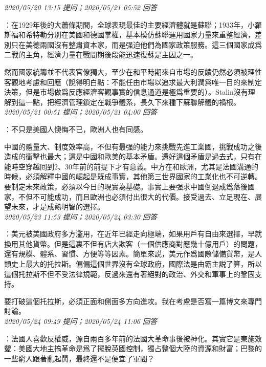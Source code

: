 \documentclass[twocolumn]{ctexart}
\begin{document}
\textit{\hfill\noindent\small 2020/05/20 13:15 提问；2020/05/21 05:52 回答}

：在1929年後的大蕭條期間，全球表現最佳的主要經濟體就是蘇聯；1933年，小羅斯福和希特勒分別在美國和德國掌權，基本模仿蘇聯運用國家力量來重整經濟，差別只在美德兩國沒有整肅資本家，而是强迫他們為國家政策服務。這三個國家成爲二戰的主角，經濟力量在戰間期後段能迅速復蘇是主因之一。

然而國家統籌並不代表官僚獨大，至少在和平時期來自市場的反饋仍然必須被理性客觀地考慮和回應（說得明白點：不能任由市場以追求最大利潤爲唯一目的來制定決策，但是市場做爲反應經濟客觀事實的信息通道是極爲重要的）。Stalin沒有理解到這一點，把經濟管理鎖定在戰爭體系，長久下來種下蘇聯解體的禍根。
\\

\textit{\hfill\noindent\small 2020/05/21 00:51 提问；2020/05/21 04:00 回答}

：不只是美國人懊悔不已，歐洲人也有同感。

中國的體量大、制度效率高，不但有最强的能力來挑戰先進工業國，挑戰成功之後造成的衝擊也最大；這是中國和歐美的基本矛盾。還好這個矛盾是過去式，只有在能時空穿越囘到2、30年前的前提下才有意義。中方在和歐洲，尤其是法國溝通的時候，必須解釋中國的崛起是既成事實，其他第三世界國家的工業化也不可逆轉。要制定未來政策，必須以今日的現實為基礎。事實上要强求中國倒退成爲落後國家，不但不可能成功，而且歐洲也必須付出很大的代價。接受過去、立足現在、展望未來，才是成熟明智的選擇。
\\

\textit{\hfill\noindent\small 2020/05/23 11:53 提问；2020/05/24 03:30 回答}

：美元被美國政府多方濫用，在近年已經走向極端，如果用戶有自由來選擇，早就換用其他貨幣。但是這裏不但有店大欺客（一個供應商對應幾十億用戶）的問題，還有規模、體系、習慣、方便等等因素。簡單來説，美元作爲國際儲備貨幣，是人類史上最大的托拉斯。偏偏這個世界沒有全球政府，國際法是由霸主説了算，所以這個托拉斯不但不受法律規範，反過來還有著絕對的政治、外交和軍事上的鞏固支持。

要打破這個托拉斯，必須正面和側面多方向進攻。我在考慮是否寫一篇博文來專門討論。
\\

\textit{\hfill\noindent\small 2020/05/24 09:49 提问；2020/05/24 11:06 回答}

：法國人喜歡反權威，源自兩百多年前的法國大革命事後被神化。其實它是東施效顰：美國大地主搞革命是爲了擺脫英國控制，獨占整個大陸的資源和財富；巴黎的一些窮人跟著亂起鬨，最終還不是便宜了軍閥？
\end{document}
